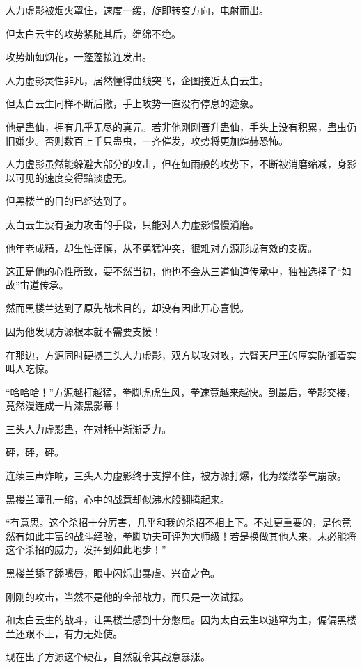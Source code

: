 \begin{this_body}
人力虚影被烟火罩住，速度一缓，旋即转变方向，电射而出。

但太白云生的攻势紧随其后，绵绵不绝。

攻势灿如烟花，一蓬蓬接连发出。

人力虚影灵性非凡，居然懂得曲线突飞，企图接近太白云生。

但太白云生同样不断后撤，手上攻势一直没有停息的迹象。

他是蛊仙，拥有几乎无尽的真元。若非他刚刚晋升蛊仙，手头上没有积累，蛊虫仍旧嫌少。否则数百上千只蛊虫，一齐催发，攻势将更加煊赫恐怖。

人力虚影虽然能躲避大部分的攻击，但在如雨般的攻势下，不断被消磨缩减，身影以可见的速度变得黯淡虚无。

但黑楼兰的目的已经达到了。

太白云生没有强力攻击的手段，只能对人力虚影慢慢消磨。

他年老成精，却生性谨慎，从不勇猛冲突，很难对方源形成有效的支援。

这正是他的心性所致，要不然当初，他也不会从三道仙道传承中，独独选择了“如故”宙道传承。

然而黑楼兰达到了原先战术目的，却没有因此开心喜悦。

因为他发现方源根本就不需要支援！

在那边，方源同时硬撼三头人力虚影，双方以攻对攻，六臂天尸王的厚实防御着实叫人吃惊。

“哈哈哈！”方源越打越猛，拳脚虎虎生风，拳速竟越来越快。到最后，拳影交接，竟然漫连成一片漆黑影幕！

三头人力虚影蛊，在对耗中渐渐乏力。

砰，砰，砰。

连续三声炸响，三头人力虚影终于支撑不住，被方源打爆，化为缕缕拳气崩散。

黑楼兰瞳孔一缩，心中的战意却似沸水般翻腾起来。

“有意思。这个杀招十分厉害，几乎和我的杀招不相上下。不过更重要的，是他竟然有如此丰富的战斗经验，拳脚功夫可评为大师级！若是换做其他人来，未必能将这个杀招的威力，发挥到如此地步！”

黑楼兰舔了舔嘴唇，眼中闪烁出暴虐、兴奋之色。

刚刚的攻击，当然不是他的全部战力，而只是一次试探。

和太白云生的战斗，让黑楼兰感到十分憋屈。因为太白云生以逃窜为主，偏偏黑楼兰还跟不上，有力无处使。

现在出了方源这个硬茬，自然就令其战意暴涨。


\end{this_body}
